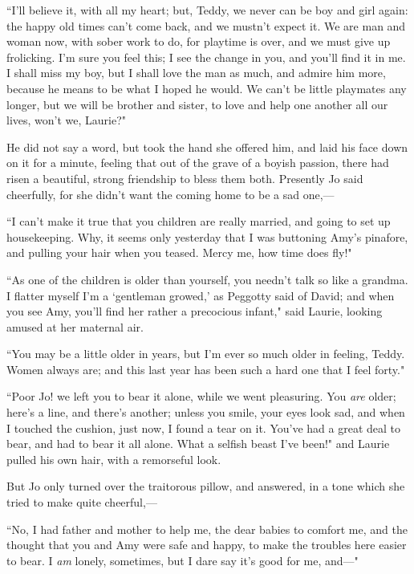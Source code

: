 ``I'll believe it, with all my heart; but, Teddy, we
never can be boy and girl again: the happy old times
can't come back, and we mustn't expect
it. We are man and woman now, with sober work to do, for playtime is
over, and we must give up frolicking. I'm sure you feel
this; I see the change in you, and you'll find it in me.
I shall miss my boy, but I shall love the man as much, and admire him
more, because he means to be what I hoped he would. We
can't be little playmates any longer, but we will be
brother and sister, to love and help one another all our lives,
won't we, Laurie?"

He did not say a word, but took the hand she offered him, and laid his
face down on it for a minute, feeling that out of the grave of a boyish
passion, there had risen a beautiful, strong friendship to bless them
both. Presently Jo said cheerfully, for she didn't want
the coming home to be a sad one,---

``I can't make it true that you children are really
married, and going to set up housekeeping. Why, it seems only yesterday
that I was buttoning Amy's pinafore, and pulling your
hair when you teased. Mercy me, how time does fly!"

``As one of the children is older than yourself, you
needn't talk so like a grandma. I flatter myself
I'm a `gentleman
growed,' as Peggotty said of David; and when you see
Amy, you'll find her rather a precocious infant," said
Laurie, looking amused at her maternal air.

``You may be a little older in years, but I'm ever so
much older in feeling, Teddy. Women always are; and this last year has
been such a hard one that I feel forty."

``Poor Jo! we left you to bear it alone, while we went pleasuring. You
\emph{are} older; here's a line, and
there's another; unless you smile, your eyes look sad,
and when I touched the cushion, just now, I found a tear on it.
You've had a great deal to bear, and had to bear it all
alone. What a selfish beast I've been!" and Laurie
pulled his own hair, with a remorseful look.

But Jo only turned over the traitorous pillow, and answered, in a tone
which she tried to make quite cheerful,---

``No, I had father and mother to help me, the dear babies to comfort me,
and the thought that you and Amy were safe and happy, to make the
troubles here easier to bear. I \emph{am} lonely, sometimes, but I dare
say it's good for me, and---"

